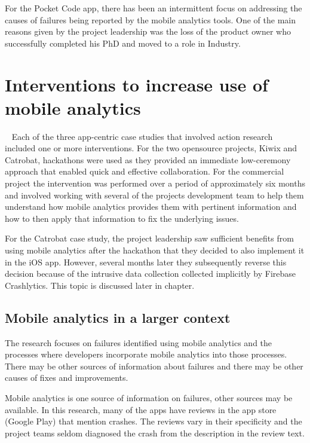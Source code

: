 
For the Pocket Code app, there has been an intermittent focus on addressing the causes of failures being reported by the mobile analytics tools. One of the main reasons given by the project leadership was the loss of the product owner who successfully completed his PhD and moved to a role in Industry. 


\section{Interventions to increase use of mobile analytics}~\label{aiu-interventions-section}
Each of the three app-centric case studies that involved action research included one or more interventions. For the two opensource projects, Kiwix and Catrobat, hackathons were used as they provided an immediate low-ceremony approach that enabled quick and effective collaboration. For the commercial project the intervention was performed over a period of approximately six months and involved working with several of the projects development team to help them understand how mobile analytics provides them with pertinent information and how to then apply that information to fix the underlying issues. 

For the Catrobat case study, the project leadership saw sufficient benefits from using mobile analytics after the hackathon that they decided to also implement it in the iOS app. However, several months later they subsequently reverse this decision because of the intrusive data collection collected implicitly by Firebase Crashlytics. This topic is discussed later in chapter.


\subsection{Mobile analytics in a larger context}
The research focuses on failures identified using mobile analytics and the processes where developers incorporate mobile analytics into those processes. There may be other sources of information about failures and there may be other causes of fixes and improvements.

Mobile analytics is one source of information on failures, other sources may be available. In this research, many of the apps have reviews in the app store (Google Play) that mention crashes. The reviews vary in their specificity and the project teams seldom diagnosed the crash from the description in the review text.   


